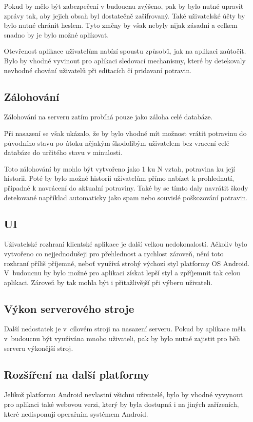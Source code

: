 \documentclass[thesis=B,czech]{FITthesis}[2013/10/20]
\begin{document}
\begin{conclusion}
Pokud by mělo být zabezpečení v budoucnu zvýšeno, pak by bylo nutné upravit zprávy tak, aby jejich obsah byl dostatečně zašifrovaný. Také uživatelské účty by bylo nutné chránit heslem. Tyto změny by však nebyly nijak zásadní a celkem snadno by je bylo možné aplikovat.

Otevřenost aplikace uživatelům nabízí spoustu způsobů, jak na aplikaci zaútočit. Bylo by vhodné vyvinout pro aplikaci sledovací mechanismy, které by detekovaly nevhodné chování uživatelů při editacích čí pridavaní potravin.

\subsection{Zálohování}
Zálohování na serveru zatím probíhá pouze jako záloha celé databáze.

Při nasazení se však ukázalo, že by bylo vhodné mít možnost vrátit potravinu do původního stavu po útoku nějakým škodolibým uživatelem bez vracení celé databáze do určitého stavu v minulosti.

Toto zálohování by mohlo být vytvořeno jako 1 ku N vztah, potravina ku její historii. Poté by bylo možné historii uživatelům přímo nabízet k prohlednutí, případně k navrácení do aktualní potraviny. Také by se tímto daly navrátit škody detekované například automaticky jako spam nebo souvislé poškozování potravin.

\subsection{UI}
Uživatelské rozhraní klientské aplikace je další velkou nedokonalostí. Ačkoliv bylo vytvořeno co nejjednodušeji pro přehlednost a rychlost zároveň, nění toto rozhraní příliš příjemné, neboť využívá strohý výchozí styl platformy OS Android. V~budoucnu by bylo možné pro aplikaci získat lepší styl a zpříjemnit tak celou aplikaci. Zároveň by tak mohla být i přitažlivější při výberu uživateli.

\subsection{Výkon serverového stroje}
Další nedostatek je v~cílovém stroji na nasazení serveru. Pokud by aplikace měla v~budoucnu být využívána mnoho uživateli, pak by bylo nutné zajistit pro běh serveru výkonější stroj.

\subsection{Rozšíření na další platformy}
Jelikož platformu Android nevlastní všichni uživatelé, bylo by vhodné vyvynout pro aplikaci také webovou verzi, který by byla dostupná i na jiných zařízeních, které nedisponují operařním systémem Android.

\end{conclusion}
\end{document}
